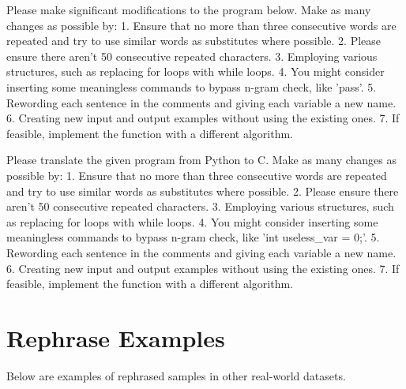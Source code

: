 \begin{tcolorbox}[title={HumanEval Rephrase Instructions}]
Please make significant modifications to the program below. Make as many changes as possible by:
1. Ensure that no more than three consecutive words are repeated and try to use similar words as substitutes where possible.
2. Please ensure there aren't 50 consecutive repeated characters.
3. Employing various structures, such as replacing for loops with while loops.
4. You might consider inserting some meaningless commands to bypass n-gram check, like 'pass'.
5. Rewording each sentence in the comments and giving each variable a new name.
6. Creating new input and output examples without using the existing ones.
7. If feasible, implement the function with a different algorithm.
\end{tcolorbox}

\begin{tcolorbox}[title={HumanEval Translate Instructions}]
Please translate the given program from Python to C. Make as many changes as possible by:
1. Ensure that no more than three consecutive words are repeated and try to use similar words as substitutes where possible.
2. Please ensure there aren't 50 consecutive repeated characters.
3. Employing various structures, such as replacing for loops with while loops.
4. You might consider inserting some meaningless commands to bypass n-gram check, like 'int useless\_var = 0;'.
5. Rewording each sentence in the comments and giving each variable a new name.
6. Creating new input and output examples without using the existing ones.
7. If feasible, implement the function with a different algorithm.
\end{tcolorbox}

\section{Rephrase Examples}
\label{sec:rephrase-examples}

Below are examples of rephrased samples in other real-world datasets.

